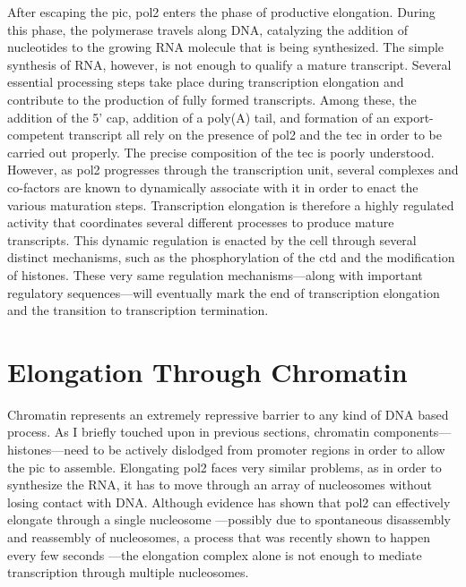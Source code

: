 After escaping the \gls{pic}, \gls{pol2} enters the phase of productive elongation.
During this phase, the polymerase travels along DNA, catalyzing the addition of nucleotides to the growing RNA molecule that is being synthesized.
The simple synthesis of RNA, however, is not enough to qualify a mature transcript.
Several essential processing steps take place during transcription elongation and contribute to the production of fully formed transcripts.
Among these, the addition of the 5' cap, addition of a poly(A) tail, and formation of an export-competent transcript all rely on the presence of \gls{pol2} and the \gls{tec} in order to be carried out properly.
The precise composition of the \gls{tec} is poorly understood. 
However, as \gls{pol2} progresses through the transcription unit, several complexes and co-factors are known to dynamically associate with it in order to enact the various maturation steps.  
Transcription elongation is therefore a highly regulated activity that coordinates several different processes to produce mature transcripts.
This dynamic regulation is enacted by the cell through several distinct mechanisms, such as the phosphorylation of the \gls{ctd} and the modification of histones.
These very same regulation mechanisms---along with important regulatory sequences---will eventually mark the end of transcription elongation and the transition to transcription termination.

\section{Elongation Through Chromatin}
Chromatin represents an extremely repressive barrier to any kind of DNA based process.
As I briefly touched upon in previous sections, chromatin components---histones---need to be actively dislodged from promoter regions in order to allow the \acrlong{pic} to assemble.
Elongating \gls{pol2} faces very similar problems, as in order to synthesize the RNA, it has to move through an array of nucleosomes without losing contact with DNA.
Although \invitro{} evidence has shown that \gls{pol2} can effectively elongate through a single nucleosome 
\citep{lorch:1987:nucleosomes}---possibly due to spontaneous disassembly and reassembly of nucleosomes, a process that was recently shown to happen every few seconds \citep{kim:2016:singlemolecule}---the elongation complex alone is not enough to mediate transcription through multiple nucleosomes.

